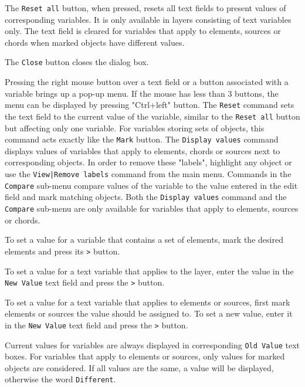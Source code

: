 \documentclass[a4paper,10pt]{report}
\begin{document}
The {\tt Reset all} button, when pressed, resets all text fields to
present values of corresponding variables. It is only available in
layers consisting of text variables only. The text field is cleared
for variables that apply to elements, sources or chords when marked
objects have different values.


The {\tt Close} button closes the dialog box.

Pressing the right mouse button over a text field or a button
associated with a variable brings up a pop-up menu. If the mouse has
less than 3 buttons, the menu can be displayed by pressing "Ctrl+left"
button.
The {\tt Reset} command sets the text field to the current value of the
variable, similar to the {\tt Reset all} button but affecting only one
variable. For variables storing sets of objects, this command acts
exactly like the {\tt Mark} button.
The {\tt Display values} command displays values of variables that apply
to elements, chords or sources next to corresponding objects. In order
to remove these "labels", highlight any object or use the
{\tt View|Remove labels} command from the main menu.
Commands in the {\tt Compare} sub-menu compare values of the variable to
the value entered in the edit field and mark matching objects.
Both the {\tt Display values} command and the {\tt Compare} sub-menu are only
available for variables that apply to elements, sources or chords.

To set a value for a variable that contains a set of elements, mark
the desired elements and press its {\tt >} button.

To set a value for a text variable that applies to the layer, enter
the value in the {\tt New Value} text field and press the {\tt >}
button.

To set a value for a text variable that applies to elements or
sources, first mark elements or sources the value should be assigned
to. To set a new value, enter it in the {\tt New Value} text field
and press the {\tt >} button.

Current values for variables are always displayed in corresponding
{\tt Old Value} text boxes. For variables that apply to elements or
sources, only values for marked objects are considered. If all values
are the same, a value will be displayed, otherwise the word
{\tt Different}.
\end{document}
